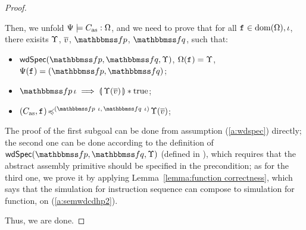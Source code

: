 {\begin{proof}
\begin{itemize}
            Then, we unfold ${\Psi} \models {C_{\text{as}}} : {\Omega}$, 
            and we need to prove that for all $\texttt{f}_{} \in \text{dom}(\Omega), 
            \iota$, there exisits $\Upsilon$, $\overline{v}$, 
            $\relspecpre$, $\relspecpost$, such that: 
            \begin{itemize}
                \small
                \item $\wdSpec{\relspecpre}{\relspecpost}{\hprim}$, 
                    $\Omega(\texttt{f}_{}) = \Upsilon$, 
                    $\Cspec(\lab{}) = (\relspecpre, \relspecpost)$;
                \item $\relspecpre \, \lgvl \implies 
                    \safePrimAst{\, \hprim(\args{\val}) \,} 
                    \sepstar \atrue$; 
                \item $\simFunction{(\asmimp, \lab{})}
                    {(\relspecpre \ \lgvl, \,\relspecpost \ \lgvl)}
                    {\hprim(\args{\val})}$; 
            \end{itemize}
            The proof of the first subgoal can be done from 
            assumption (\ref{a:wdspec}) directly; the second 
            one can be done according to the definition of 
            $\wdSpec{\relspecpre}{\relspecpost}{\hprim}$
            (defined in \Def{\ref{def:well-defined specification}}), 
            which requires that the abstract assembly primitive should 
            be specified in the precondition; as for the 
            third one, we prove it by applying 
            Lemma~\ref{lemma:function correctness}, which 
            says that the simulation for instruction sequence 
            can compose to simulation for function, on 
            (\ref{a:semwdcdhp2}). 
    \end{itemize}
    Thus, we are done.
\end{proof}

}
